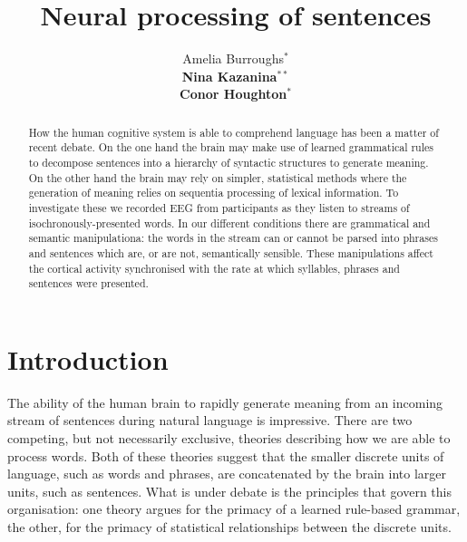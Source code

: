 \documentclass[a4paper,10pt,twoside]{article}
\begin{document}
\title{Neural processing of sentences}

\author{Amelia Burroughs$^*$ \\
{\normalsize \bf Nina Kazanina}$^{**}$ \\
{\normalsize \bf Conor Houghton}$^*$ 
\AND {}
\AND {} }


\maketitle\thispagestyle{empty} %

\begin{abstract}

How the human cognitive system is able to comprehend language has been
a matter of recent debate. On the one hand the brain may make use of
learned grammatical rules to decompose sentences into a hierarchy of
syntactic structures to generate meaning. On the other hand the brain
may rely on simpler, statistical methods where the generation of
meaning relies on sequentia processing of lexical information. To
investigate these we recorded EEG from participants as they listen to
streams of isochronously-presented words. In our different conditions
there are grammatical and semantic manipulationa: the words in the
stream can or cannot be parsed into phrases and sentences which are,
or are not, semantically sensible. These manipulations affect the
cortical activity synchronised with the rate at which syllables,
phrases and sentences were presented.

\end{abstract}

\section{Introduction}

The ability of the human brain to rapidly generate meaning from an
incoming stream of sentences during natural language is
impressive. There are two competing, but not necessarily exclusive,
theories describing how we are able to process words. Both of these
theories suggest that the smaller discrete units of language, such as
words and phrases, are concatenated by the brain into larger units,
such as sentences. What is under debate is the principles that govern
this organisation: one theory argues for the primacy of a learned
rule-based grammar, the other, for the primacy of statistical
relationships between the discrete units.
\end{document}
